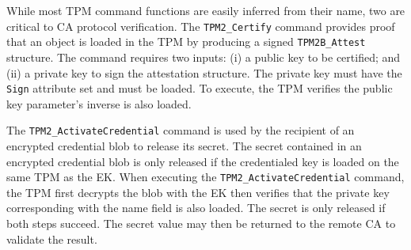\documentclass[runningheads]{llncs}
\begin{document}


While most TPM command functions are easily inferred from their name,
two are critical to CA protocol verification.  The \verb|TPM2_Certify|
command provides proof that an object is loaded in the TPM by
producing a signed \verb|TPM2B_Attest| structure. The command requires
two inputs: (i) a public key to be certified; and (ii) a private key
to sign the attestation structure. The private key must have the
\verb|Sign| attribute set and must be loaded. To execute, the TPM
verifies the public key parameter's inverse is also loaded.



The \verb|TPM2_ActivateCredential| command is used by the recipient of
an encrypted credential blob to release its secret.  The secret
contained in an encrypted credential blob is only released if the
credentialed key is loaded on the same TPM as the EK.  When executing
the \verb|TPM2_ActivateCredential| command, the TPM first decrypts the
blob with the EK then verifies that the private key corresponding with
the name field is also loaded. The secret is only released if both
steps succeed. The secret value may then be returned to the remote CA
to validate the result.
\end{document}
